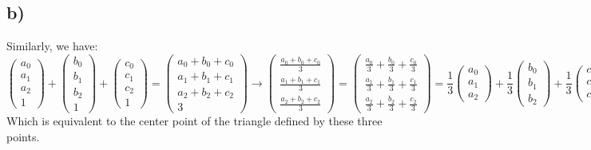 \documentclass{article}
\begin{document}
\subsection*{b)}
    Similarly, we have:
    $$\left(\begin{matrix} a_0\\a_1\\a_2\\1\end{matrix}\right) + \left(\begin{matrix} b_0\\b_1\\b_2\\1\end{matrix}\right) + \left(\begin{matrix} c_0\\c_1\\c_2\\1\end{matrix}\right)
    = \left(\begin{matrix} a_0 + b_0 + c_0\\a_1 + b_1 + c_1\\a_2 + b_2 + c_2\\3\end{matrix}\right)
    \rightarrow \left(\begin{matrix} \frac{a_0 + b_0 + c_0}{3}\\ \frac{a_1 + b_1 + c_1}{3}\\ \frac{a_2 + b_2 + c_2}{3}\end{matrix}\right)
    = \left(\begin{matrix} \frac{a_0}{3} + \frac{b_0}{3} + \frac{c_0}{3}\\ \frac{a_1}{3} + \frac{b_1}{3} + \frac{c_1}{3}\\ \frac{a_2}{3} + \frac{b_2}{3} + \frac{c_2}{3}\end{matrix}\right)
    = \frac{1}{3}\left(\begin{matrix} a_0\\a_1\\a_2\end{matrix}\right)
    + \frac{1}{3}\left(\begin{matrix} b_0\\b_1\\b_2\end{matrix}\right)
    + \frac{1}{3}\left(\begin{matrix} c_0\\c_1\\c_2\end{matrix}\right)$$
    Which is equivalent to the center point of the triangle defined by these three points.
\end{document}

